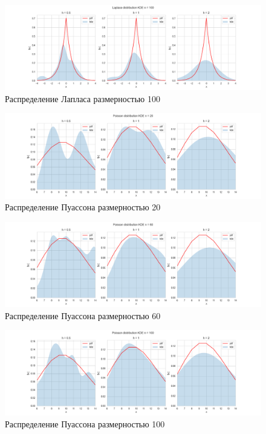 \documentclass[a4paper,14pt]{article}
\begin{document}
	\begin{figure}[H]
		\centering
		\includegraphics[scale=0.35]{../image/lab4/lab4_kde_laplace_100.png}
		\caption{Распределение Лапласа размерностью 100}
	\end{figure}
	
	\begin{figure}[H]
		\centering
		\includegraphics[scale=0.35]{../image/lab4/lab4_kde_poisson_20.png}
		\caption{Распределение Пуассона размерностью 20}
	\end{figure}
	
	\begin{figure}[H]
		\centering
		\includegraphics[scale=0.35]{../image/lab4/lab4_kde_poisson_60.png}
		\caption{Распределение Пуассона размерностью 60}
	\end{figure}
	
	\begin{figure}[H]
		\centering
		\includegraphics[scale=0.35]{../image/lab4/lab4_kde_poisson_100.png}
		\caption{Распределение Пуассона размерностью 100}
	\end{figure}
	
\end{document}
